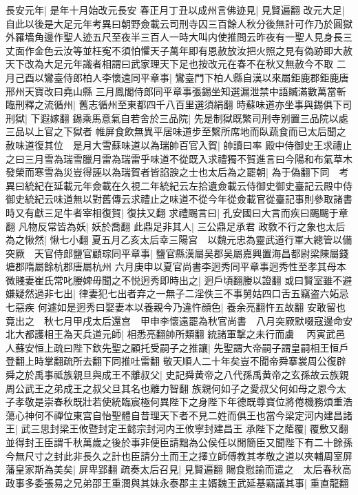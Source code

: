 長安元年|{
	是年十月始改元長安}
春正月丁丑以成州言佛迹見|{
	見賢遍翻}
改元大足|{
	自此以後是大足元年考異曰朝野僉載云司刑寺囚三百餘人秋分後無計可作乃於圓獄外羅墻角邊作聖人迹五尺至夜半三百人一時大叫内使推問云昨夜有一聖人見身長三丈面作金色云汝等並枉寃不須怕懼天子萬年即有恩赦放汝把火照之見有偽跡即大赦天下改為大足元年識者相謂曰武家理天下足也按改元在春不在秋又無赦今不取}
二月己酉以鸞臺侍郎柏人李懷遠同平章事|{
	鸞臺門下柏人縣自漢以來屬鉅鹿郡鉅鹿唐邢州天寶改曰堯山縣}
三月鳳閣侍郎同平章事張錫坐知選漏泄禁中語贓滿數萬當斬臨刑釋之流循州|{
	舊志循州至東都四千八百里選須絹翻}
時蘇味道亦坐事與錫俱下司刑獄|{
	下遐嫁翻}
錫乘馬意氣自若舍於三品院|{
	先是制獄既繁司刑寺别置三品院以處三品以上官之下獄者}
帷屏食飲無異平居味道步至繫所席地而臥蔬食而已太后聞之赦味道復其位　是月大雪蘇味道以為瑞帥百官入賀|{
	帥讀曰率}
殿中侍御史王求禮止之曰三月雪為瑞雪臘月雷為瑞雷乎味道不從既入求禮獨不賀進言曰今陽和布氣草木發榮而寒雪為災豈得誣以為瑞賀者皆諂諛之士也太后為之罷朝|{
	為于偽翻下同　考異曰統紀在延載元年僉載在久視二年統紀云左拾遺僉載云侍御史御史臺記云殿中侍御史統紀云味道無以對舊傳云求禮止之味道不從今年從僉載官從臺記事則參取諸書}
時又有獻三足牛者宰相復賀|{
	復扶又翻}
求禮颺言曰|{
	孔安國曰大言而疾曰颺颺于章翻}
凡物反常皆為妖|{
	妖於喬翻}
此鼎足非其人|{
	三公鼎足承君}
政敎不行之象也太后為之愀然|{
	愀七小翻}
夏五月乙亥太后幸三陽宫　以魏元忠為靈武道行軍大總管以備突厥　天官侍郎鹽官顧琮同平章事|{
	鹽官縣漢屬吴郡吴屬嘉興置海昌都尉梁陳屬錢塘郡隋屬餘杭郡唐屬杭州}
六月庚申以夏官尚書李迥秀同平章事迥秀性至孝其母本微賤妻崔氏常叱媵婢毋聞之不悦迥秀即時出之|{
	迥戶頃翻媵以證翻}
或曰賢室雖不避嫌疑然過非七出|{
	律妻犯七出者弃之一無子二淫佚三不事舅姑四口舌五竊盗六妬忌七惡疾}
何遽如是迥秀曰娶妻本以養親今乃違忤顔色|{
	養余亮翻忤五故翻}
安敢留也竟出之　秋七月甲戌太后還宫　甲申李懷遠罷為秋官尚書　八月突厥默啜寇邊命安北大都護相王為天兵道元師|{
	相悉亮翻帥所類翻}
統諸軍撃之未行而虜　丙寅武邑人蘇安恒上疏曰陛下欽先聖之顧托受嗣子之推讓|{
	先聖謂大帝嗣子謂皇嗣相王恒戶登翻上時掌翻疏所去翻下同推吐雷翻}
敬天順人二十年矣豈不聞帝舜搴裳周公復辟舜之於禹事祗族親旦與成王不離叔父|{
	史記舜黄帝之八代孫禹黄帝之玄孫故云族親周公武王之弟成王之叔父旦其名也離力智翻}
族親何如子之愛叔父何如母之恩今太子孝敬是崇春秋既壯若使統臨宸極何異陛下之身陛下年德既尊寶位將倦機務煩重浩蕩心神何不禪位東宫自怡聖體自昔理天下者不見二姓而俱王也當今梁定河内建昌諸王|{
	武三思封梁王攸暨封定王懿宗封河内王攸寧封建昌王}
承陛下之䕃覆|{
	覆敷又翻}
並得封王臣謂千秋萬歲之後於事非便臣請黜為公侯任以閒簡臣又聞陛下有二十餘孫今無尺寸之封此非長久之計也臣請分土而王之擇立師傅教其孝敬之道以夾輔周室屏藩皇家斯為美矣|{
	屏卑郢翻}
疏奏太后召見|{
	見賢遍翻}
賜食慰諭而遣之　太后春秋高政事多委張易之兄弟邵王重潤與其妹永泰郡主主婿魏王武延基竊議其事|{
	重直龍翻}
